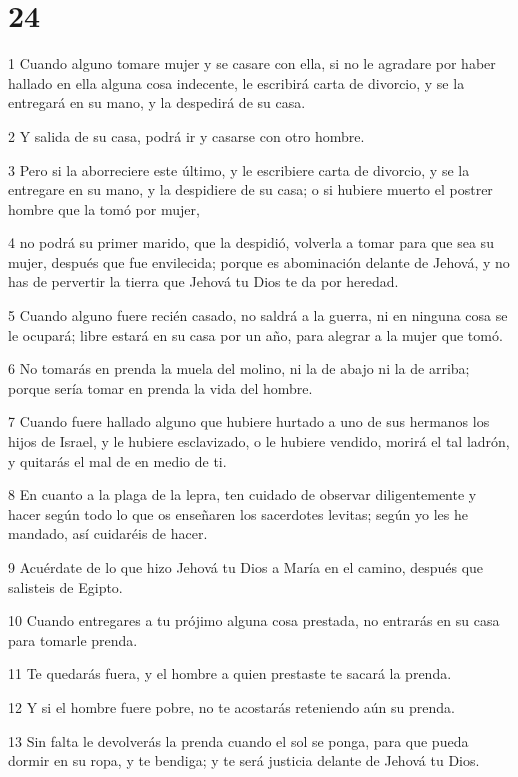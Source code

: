 \chapter{24}

\par 1 Cuando alguno tomare mujer y se casare con ella, si no le agradare por haber hallado en ella alguna cosa indecente, le escribirá carta de divorcio, y se la entregará en su mano, y la despedirá de su casa.
\par 2 Y salida de su casa, podrá ir y casarse con otro hombre.
\par 3 Pero si la aborreciere este último, y le escribiere carta de divorcio, y se la entregare en su mano, y la despidiere de su casa; o si hubiere muerto el postrer hombre que la tomó por mujer,
\par 4 no podrá su primer marido, que la despidió, volverla a tomar para que sea su mujer, después que fue envilecida; porque es abominación delante de Jehová, y no has de pervertir la tierra que Jehová tu Dios te da por heredad.
\par 5 Cuando alguno fuere recién casado, no saldrá a la guerra, ni en ninguna cosa se le ocupará; libre estará en su casa por un año, para alegrar a la mujer que tomó.
\par 6 No tomarás en prenda la muela del molino, ni la de abajo ni la de arriba; porque sería tomar en prenda la vida del hombre.
\par 7 Cuando fuere hallado alguno que hubiere hurtado a uno de sus hermanos los hijos de Israel, y le hubiere esclavizado, o le hubiere vendido, morirá el tal ladrón, y quitarás el mal de en medio de ti.
\par 8 En cuanto a la plaga de la lepra, ten cuidado de observar diligentemente y hacer según todo lo que os enseñaren los sacerdotes levitas; según yo les he mandado, así cuidaréis de hacer.
\par 9 Acuérdate de lo que hizo Jehová tu Dios a María en el camino, después que salisteis de Egipto.
\par 10 Cuando entregares a tu prójimo alguna cosa prestada, no entrarás en su casa para tomarle prenda.
\par 11 Te quedarás fuera, y el hombre a quien prestaste te sacará la prenda.
\par 12 Y si el hombre fuere pobre, no te acostarás reteniendo aún su prenda.
\par 13 Sin falta le devolverás la prenda cuando el sol se ponga, para que pueda dormir en su ropa, y te bendiga; y te será justicia delante de Jehová tu Dios. 
